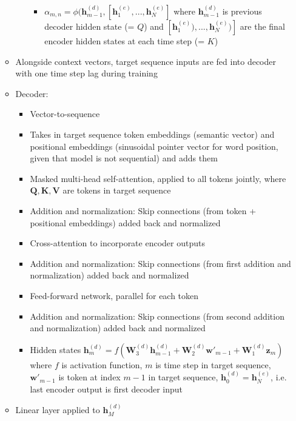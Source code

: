 \begin{itemize}
\begin{itemize}
\begin{itemize}
\begin{itemize}
                \item $\alpha_{m,n} = \phi(\boldsymbol{h}_{m-1}^{(d)}, [\boldsymbol{h}_1^{(e)}, ..., \boldsymbol{h}_N^{(e)}]$ where $\boldsymbol{h}_{m-1}^{(d)}$ is previous decoder hidden state (= $Q$) and $[\boldsymbol{h}_1^{(e)}), ..., \boldsymbol{h}_N^{(e)})]$ are the final encoder hidden states at each time step (= $K$)
            \end{itemize}
        \end{itemize}
        \item Alongside context vectors, target sequence inputs are fed into decoder with one time step lag during training
        \item Decoder: 
        \begin{itemize}
            \item Vector-to-sequence
            \item Takes in target sequence token embeddings (semantic vector) and positional embeddings (sinusoidal pointer vector for word position, given that model is not sequential) and adds them
            \item Masked multi-head self-attention, applied to all tokens jointly, where $\boldsymbol{Q,K,V}$ are tokens in target sequence
            \item Addition and normalization: Skip connections (from token + positional embeddings) added back and normalized
            \item Cross-attention to incorporate encoder outputs
            \item Addition and normalization: Skip connections (from first addition and normalization) added back and normalized
            \item Feed-forward network, parallel for each token
            \item Addition and normalization: Skip connections (from second addition and normalization) added back and normalized
            \item Hidden states $\boldsymbol{h}_m^{(d)} = f ( \boldsymbol{W}_3^{(d)} \boldsymbol{h}_{m-1}^{(d)} + \boldsymbol{W}_2^{(d)} \boldsymbol{w'}_{m-1} + \boldsymbol{W}_1^{(d)} \boldsymbol{z}_m)$ where $f$ is activation function, $m$ is time step in target sequence, $\boldsymbol{w'}_{m-1}$ is token at index $m-1$ in target sequence, $\boldsymbol{h}_0^{(d)} = \boldsymbol{h}_N^{(e)}$, i.e. last encoder output is first decoder input
        \end{itemize}
        \item Linear layer applied to $\boldsymbol{h}_M^{(d)}$

\end{itemize}
\end{itemize}

